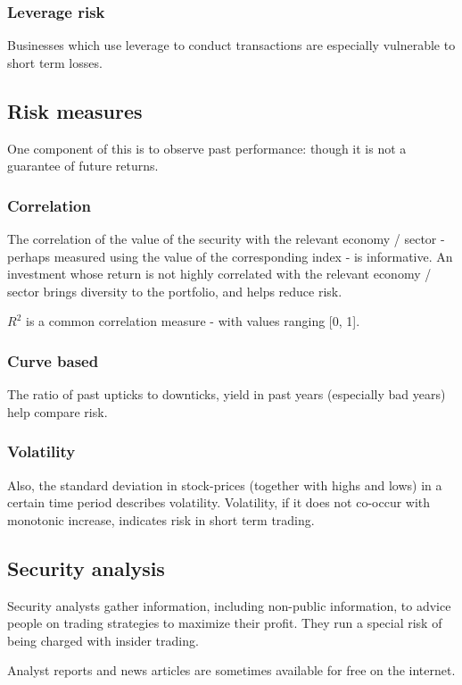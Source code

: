 \documentclass[oneside, article]{memoir}
\begin{document}
\subsubsection{Leverage risk}
Businesses which use leverage to conduct transactions are especially vulnerable to short term losses.

\subsection{Risk measures}
One component of this is to observe past performance: though it is not a guarantee of future returns.

\subsubsection{Correlation}
The correlation of the value of the security with the relevant economy / sector - perhaps measured using the value of the corresponding index - is informative. An investment whose return is not highly correlated with the relevant economy / sector brings diversity to the portfolio, and helps reduce risk.

$R^2$ is a common correlation measure - with values ranging [0, 1].

\subsubsection{Curve based}
The ratio of past upticks to downticks, yield in past years (especially bad years) help compare risk.

\subsubsection{Volatility}
Also, the standard deviation in stock-prices (together with highs and lows) in a certain time period describes volatility. Volatility, if it does not co-occur with monotonic increase, indicates risk in short term trading.

\subsection{Security analysis}
Security analysts gather information, including non-public information, to advice people on trading strategies to maximize their profit. They run a special risk of being charged with insider trading.

Analyst reports and news articles are sometimes available for free on the internet.
\end{document}
